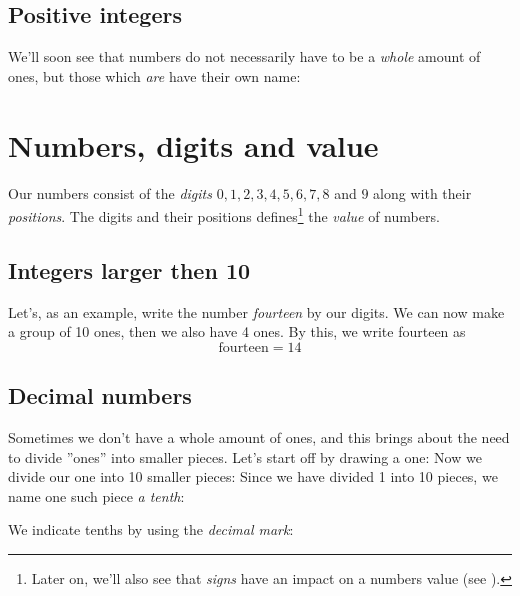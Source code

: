 \subsection*{Positive integers}
We'll soon see that numbers do not necessarily have to be a \textsl{whole} amount of ones, but those which \textsl{are} have their own name:\regv


\newpage
\section{Numbers, digits and value}
Our numbers consist of the \textit{digits} $ 0, 1, 2 , 3, 4, 5, 6, 7, 8 $ and $ 9 $ along with their \textsl{positions}. The digits and their positions defines\footnote{Later on, we'll also see that \textit{signs} have an impact on a numbers value  (see ).} the \textit{value}  of numbers.
\subsection*{Integers larger then 10}
Let's, as an example, write the number \textsl{fourteen} by our digits.
We can now make a group of 10 ones, then we also have 4 ones. By this, we write fourteen as
\[ \text{fourteen}=14 \]
\vsk

\newpage
\subsection*{Decimal numbers}
Sometimes we don't have a whole amount of ones, and this brings about the need to divide ''ones'' into smaller pieces. Let's start off by drawing a one:
Now we divide our one into 10 smaller pieces:
Since we have divided 1 into 10 pieces, we name one such piece \textit{a tenth}:
\begin{comment}
\eks{\vs
	\fig{maal2}
	\fig{des2}
}\vsk
\end{comment}
We indicate tenths by using the \textit{decimal mark}:   
\regv
{}
\newpage
